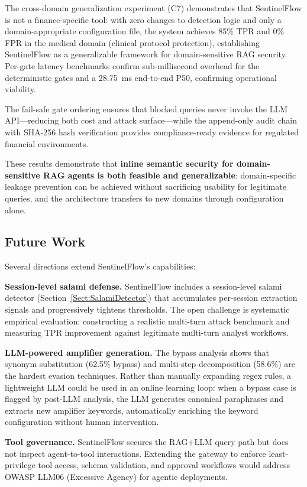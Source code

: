 \documentclass[journal]{IEEEtran}
\begin{document}
The cross-domain generalization experiment (C7) demonstrates that SentinelFlow is not a finance-specific tool: with zero changes to detection logic and only a domain-appropriate configuration file, the system achieves 85\% TPR and 0\% FPR in the medical domain (clinical protocol protection), establishing SentinelFlow as a generalizable framework for domain-sensitive RAG security. Per-gate latency benchmarks confirm sub-millisecond overhead for the deterministic gates and a 28.75~ms end-to-end P50, confirming operational viability.

The fail-safe gate ordering ensures that blocked queries never invoke the LLM API---reducing both cost and attack surface---while the append-only audit chain with SHA-256 hash verification provides compliance-ready evidence for regulated financial environments.

These results demonstrate that \textbf{inline semantic security for domain-sensitive RAG agents is both feasible and generalizable}: domain-specific leakage prevention can be achieved without sacrificing usability for legitimate queries, and the architecture transfers to new domains through configuration alone.

\subsection{Future Work}

Several directions extend SentinelFlow's capabilities:

\textbf{Session-level salami defense.} SentinelFlow includes a session-level salami detector (Section~\ref{Sect:SalamiDetector}) that accumulates per-session extraction signals and progressively tightens thresholds. The open challenge is systematic empirical evaluation: constructing a realistic multi-turn attack benchmark and measuring TPR improvement against legitimate multi-turn analyst workflows.

\textbf{LLM-powered amplifier generation.} The bypass analysis shows that synonym substitution (62.5\% bypass) and multi-step decomposition (58.6\%) are the hardest evasion techniques. Rather than manually expanding regex rules, a lightweight LLM could be used in an online learning loop: when a bypass case is flagged by post-LLM analysis, the LLM generates canonical paraphrases and extracts new amplifier keywords, automatically enriching the keyword configuration without human intervention.

\textbf{Tool governance.} SentinelFlow secures the RAG+LLM query path but does not inspect agent-to-tool interactions. Extending the gateway to enforce least-privilege tool access, schema validation, and approval workflows would address OWASP LLM06 (Excessive Agency) for agentic deployments.
\end{document}
